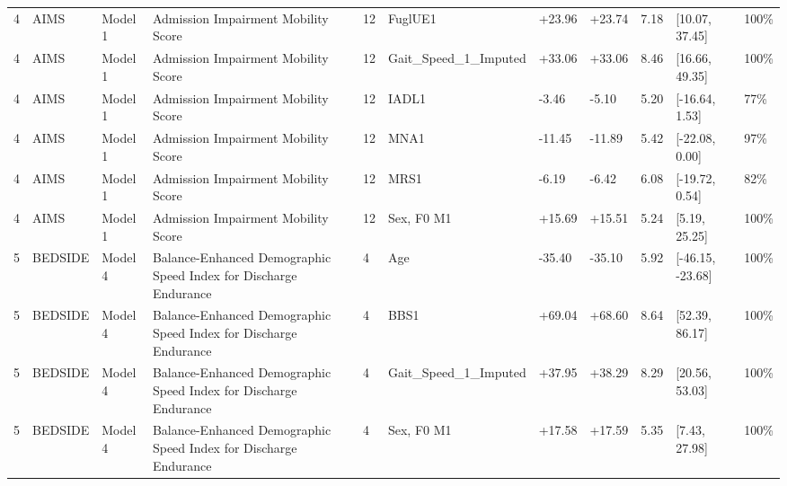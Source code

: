 \begin{tabular}{lllllllllll}
4 & AIMS & Model 1 & Admission Impairment Mobility Score & 12 & FuglUE1 & +23.96 & +23.74 & 7.18 & [10.07, 37.45] & 100\% \\
4 & AIMS & Model 1 & Admission Impairment Mobility Score & 12 & Gait\_Speed\_1\_Imputed & +33.06 & +33.06 & 8.46 & [16.66, 49.35] & 100\% \\
4 & AIMS & Model 1 & Admission Impairment Mobility Score & 12 & IADL1 & -3.46 & -5.10 & 5.20 & [-16.64, 1.53] & 77\% \\
4 & AIMS & Model 1 & Admission Impairment Mobility Score & 12 & MNA1 & -11.45 & -11.89 & 5.42 & [-22.08, 0.00] & 97\% \\
4 & AIMS & Model 1 & Admission Impairment Mobility Score & 12 & MRS1 & -6.19 & -6.42 & 6.08 & [-19.72, 0.54] & 82\% \\
4 & AIMS & Model 1 & Admission Impairment Mobility Score & 12 & Sex, F0 M1 & +15.69 & +15.51 & 5.24 & [5.19, 25.25] & 100\% \\
5 & BEDSIDE & Model 4 & Balance-Enhanced Demographic Speed Index for Discharge Endurance & 4 & Age & -35.40 & -35.10 & 5.92 & [-46.15, -23.68] & 100\% \\
5 & BEDSIDE & Model 4 & Balance-Enhanced Demographic Speed Index for Discharge Endurance & 4 & BBS1 & +69.04 & +68.60 & 8.64 & [52.39, 86.17] & 100\% \\
5 & BEDSIDE & Model 4 & Balance-Enhanced Demographic Speed Index for Discharge Endurance & 4 & Gait\_Speed\_1\_Imputed & +37.95 & +38.29 & 8.29 & [20.56, 53.03] & 100\% \\
5 & BEDSIDE & Model 4 & Balance-Enhanced Demographic Speed Index for Discharge Endurance & 4 & Sex, F0 M1 & +17.58 & +17.59 & 5.35 & [7.43, 27.98] & 100\% \\
\hline
\end{tabular}
